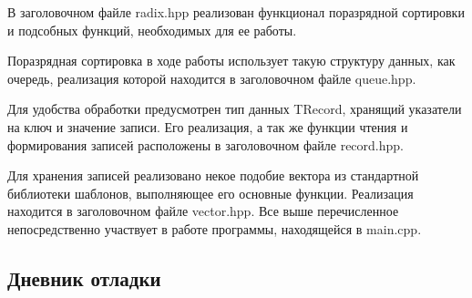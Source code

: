 \documentclass[12pt]{article}
\begin{document}
В заголовочном файле radix.hpp реализован функционал поразрядной сортировки и подсобных функций, необходимых для ее работы.

Поразрядная сортировка в ходе работы использует такую структуру данных, как очередь, реализация которой находится в заголовочном файле queue.hpp.

Для удобства обработки предусмотрен тип данных TRecord, хранящий указатели на ключ и значение записи. Его реализация, а так же функции чтения и формирования записей расположены в заголовочном файле record.hpp.

Для хранения записей реализовано некое подобие вектора из стандартной библиотеки шаблонов, выполняющее его основные функции. Реализация находится в заголовочном файле vector.hpp. Все выше перечисленное непосредственно участвует в работе программы, находящейся в main.cpp. 

\subsection*{Дневник отладки}
\end{document}

